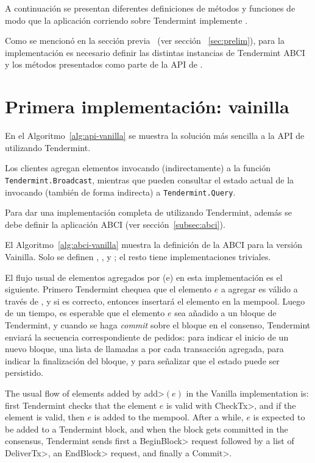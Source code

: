 %
A continuación se presentan diferentes definiciones de métodos y funciones de
modo que la aplicación corriendo sobre Tendermint implemente \setchain.

%
Como se mencionó en la sección previa ~(ver sección ~\ref{sec:prelim}), para la
implementación es necesario definir las distintas instancias de Tendermint ABCI
y los métodos presentados como parte de la API de \setchain.

\section{Primera implementación: vainilla}\label{sec:vanilla}


%
En el Algoritmo~\ref{alg:api-vanilla} se muestra la solución más sencilla a la API
de \setchain utilizando Tendermint.
%

Los clientes agregan elementos invocando (indirectamente) a la función
\texttt{Tendermint.Broadcast}, mientras que pueden consultar el estado actual de
la \setchain invocando (también de forma indirecta) a \texttt{Tendermint.Query}.
%

Para dar una implementación completa de \setchain utilizando Tendermint, además se
debe definir la aplicación ABCI (ver sección~\ref{subsec:abci}). 
%

El Algoritmo~\ref{alg:abci-vanilla} muestra la definición de la ABCI para la versión
Vainilla.
%
Solo se definen \CheckTx, \DeliverTx, y \EndBlock; el resto tiene implementaciones
triviales.

%
El flujo usual de elementos agregados por \Add(e) en esta implementación es el siguiente.
%
Primero Tendermint chequea que el elemento $e$ a agregar es válido a través de
\CheckTx, y si es correcto, entonces insertará el elemento en la mempool.
%
Luego de un tiempo, es esperable que el elemento $e$ sea añadido a un bloque de Tendermint,
y cuando se haga \textit{commit} sobre el bloque en el consenso, Tendermint enviará
la secuencia correspondiente de pedidos: \BeginBlock para indicar el inicio de un nuevo bloque,
una lista de llamadas a \DeliverTx por cada transacción agregada, \EndBlock para indicar la
finalización del bloque, y \Commit para señalizar que el estado puede ser persistido.


%

The usual flow of elements added by \<add>\((e)\) in the Vanilla implementation
is: first Tendermint checks that the element \(e\) is valid with \<CheckTx>, and if the
element is valid, then \(e\) is added to the mempool.
%
After a while, $e$ is expected to be added to a Tendermint block, and when the
block gets committed in the consensus, Tendermint sends first a \<BeginBlock>
request followed by a list of \<DeliverTx>, an \<EndBlock> request, and finally a
\<Commit>.
%

